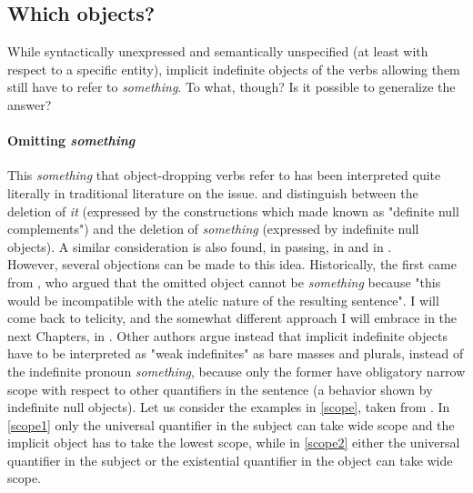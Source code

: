 \subsection{Which objects?} 

While syntactically unexpressed and semantically unspecified (at least with respect to a specific entity), implicit indefinite objects of the verbs allowing them still have to refer to \textit{something}. To what, though? Is it possible to generalize the answer?

\paragraph{Omitting \textit{something}}
This \textit{something} that object-dropping verbs refer to has been interpreted quite literally in traditional literature on the issue. \textcite{KatzPostal1967integrated} and \textcite{FraserRoss1970idioms} distinguish between the deletion of \textit{it} (expressed by the constructions which \textcite{fillmore1969types, Fillmore1986} made known as "definite null complements") and the deletion of \textit{something} (expressed by indefinite null objects). A similar consideration is also found, in passing, in \textcite[30]{PethoKardos2006} and in \textcite[6]{Ahringberg2015}.\\
However, several objections can be made to this idea. Historically, the first came from \textcite{Mittwoch1982, Mittwoch2005}, who argued that the omitted object cannot be \textit{something} because "this would be incompatible with the atelic nature of the resulting sentence". I will come back to telicity, and the somewhat different approach I will embrace in the next Chapters, in . Other authors \parencite{Marti2015, fodor1980functional, Melchin2019, Gillon2012, Gillon2006english, gillon2011french, Dvorak2017, Lasersohn1993, CondoravdiGawron1996} argue instead that implicit indefinite objects have to be interpreted as "weak indefinites" \parencite[55]{Melchin2019} as bare masses and plurals, instead of the indefinite pronoun \textit{something}, because only the former have obligatory narrow scope with respect to other quantifiers in the sentence (a behavior shown by indefinite null objects). Let us consider the examples in \ref{scope}, taken from \parencite[55]{Melchin2019}. In \ref{scope1} only the universal quantifier in the subject can take wide scope and the implicit object has to take the lowest scope, while in \ref{scope2} either the universal quantifier in the subject or the existential quantifier in the object can take wide scope.

